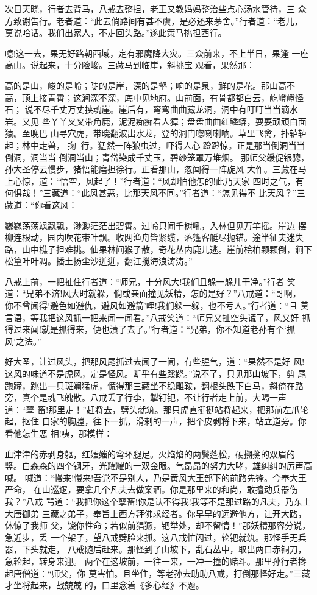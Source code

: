 次日天晓，行者去背马，八戒去整担，老王又教妈妈整治些点心汤水管待，三
众方致谢告行。老者道：“此去倘路间有甚不虞，是必还来茅舍。”行者道：“老儿，
莫说哈话。我们出家人，不走回头路。”遂此策马挑担西行。

噫!这一去，果无好路朝西域，定有邪魔降大灾。三众前来，不上半日，果逢
一座高山。说起来，十分险峻。三藏马到临崖，斜挑宝观看，果然那：

高的是山，峻的是岭；陡的是崖，深的是壑；响的是泉，鲜的是花。那山高不
高，顶上接青霄；这涧深不深，底中见地府。山前面，有骨都都白云，屹嶝嶝怪石；
说不尽千丈万丈挟魂崖。崖后有，弯弯曲曲藏龙洞，洞中有叮叮当当滴水岩。又见
些丫丫叉叉带角鹿，泥泥痴痴看人獐；盘盘曲曲红鳞蟒，耍耍顽顽白面猿。至晚巴
山寻穴虎，带晓翻波出水龙，登的洞门唿喇喇响。草里飞禽，扑轳轳起；林中走兽，
掬行。猛然一阵狼虫过，吓得人心蹬蹬惊。正是那当倒洞当当倒洞，洞当当
倒洞当山；青岱染成千丈玉，碧纱笼罩万堆烟。
那师父缓促银骢，孙大圣停云慢步，猪悟能磨担徐行。正看那山，忽闻得一阵旋风
大作。三藏在马上心惊，道：“悟空，风起了！”行者道：“风却怕他怎的!此乃天家
四时之气，有何惧哉！”三藏道：“此风甚恶，比那天风不同。”行者道：“怎见得不
比天风？”三藏道：“你看这风：

巍巍荡荡飒飘飘，渺渺茫茫出碧霄。过岭只闻千树吼，入林但见万竿摇。岸边
摆柳连根动，园内吹花带叶飘。收网渔舟皆紧缆，落篷客艇尽抛锚。途半征夫迷失
路，山中樵子担难挑。仙果林间猴子散，奇花丛内鹿儿逃。崖前桧柏颗颗倒，涧下
松篁叶叶凋。播土扬尘沙迸迸，翻江搅海浪涛涛。”

八戒上前，一把扯住行者道：“师兄，十分风大!我们且躲一躲儿干净。”行者
笑道：“兄弟不济!风大时就躲，倘或亲面撞见妖精，怎的是好？”八戒道：“哥啊，
你不曾闻得‘避色如避仇，避风如避箭’哩!我们躲一躲，也不亏人。”行者道：“且
莫言语，等我把这风抓一把来闻一闻看。”八戒笑道：“师兄又扯空头谎了，风又好
抓得过来闻!就是抓得来，便也渍了去了。”行者道：“兄弟，你不知道老孙有个‘抓
风’之法。”

好大圣，让过风头，把那风尾抓过去闻了一闻，有些腥气，道：“果然不是好
风!这风的味道不是虎风，定是怪风。断乎有些蹊跷。”说不了，只见那山坡下，剪
尾跑蹄，跳出一只斑斓猛虎，慌得那三藏坐不稳雕鞍，翻根头跌下白马，斜倚在路
旁，真个是魂飞魄散。八戒丢了行李，掣钉钯，不让行者走上前，大喝一声道：“孽
畜!那里走！”赶将去，劈头就筑。那只虎直挺挺站将起来，把那前左爪轮起，抠住
自家的胸膛，往下一抓，滑剌的一声，把个皮剥将下来，站立道旁。你看他怎生恶
相!咦，那模样：

血津津的赤剥身躯，红媸媸的弯环腿足。火焰焰的两鬓蓬松，硬搠搠的双眉的
竖。白森森的四个钢牙，光耀耀的一双金眼。气昂昂的努力大哮，雄纠纠的厉声高
喊。
喊道：“慢来!慢来!吾党不是别人，乃是黄风大王部下的前路先锋。今奉大王严命，
在山巡逻，要拿几个凡夫去做案酒。你是那里来的和尚，敢擅动兵器伤我？”八戒
骂道：“我把你这个孽畜!你是认不得我!我等不是那过路的凡夫，乃东土大唐御弟
三藏之弟子，奉旨上西方拜佛求经者。你早早的远避他方，让开大路，休惊了我师
父，饶你性命；若似前猖獗，钯举处，却不留情！”那妖精那容分说，急近步，丢
一个架子，望八戒劈脸来抓。这八戒忙闪过，轮钯就筑。那怪手无兵器，下头就走，
八戒随后赶来。那怪到了山坡下，乱石丛中，取出两口赤铜刀，急轮起，转身来迎。
两个在这坡前，一往一来，一冲一撞的赌斗。那里孙行者搀起唐僧道：“师父，你
莫害怕。且坐住，等老孙去助助八戒，打倒那怪好走。”三藏才坐将起来，战兢兢
的，口里念着《多心经》不题。

